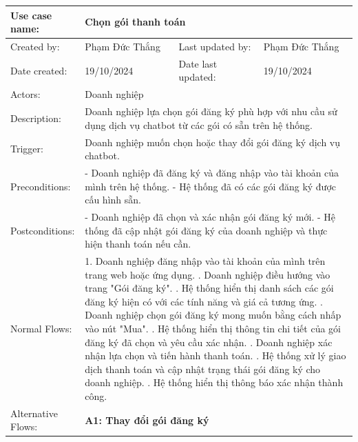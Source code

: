 \begin{table}[H]
\centering
\begin{tabular}{|l|l|l|l|}
\hline
Use case name: & \multicolumn{3}{|l|}{Chọn gói thanh toán} \\
\hline
Created by: & Phạm Đức Thắng & Last updated by: & Phạm Đức Thắng \\
\hline
Date created: & 19/10/2024 & Date last updated: & 19/10/2024 \\
\hline
Actors: & \multicolumn{3}{|l|}{Doanh nghiệp} \\
\hline
Description: & \multicolumn{3}{|p{12cm}|}{Doanh nghiệp lựa chọn gói đăng ký phù hợp với nhu cầu sử dụng dịch vụ chatbot từ các gói có sẵn trên hệ thống.} \\
\hline
Trigger: & \multicolumn{3}{|p{12cm}|}{Doanh nghiệp muốn chọn hoặc thay đổi gói đăng ký dịch vụ chatbot.} \\
\hline
Preconditions: & \multicolumn{3}{|p{12cm}|}{
- Doanh nghiệp đã đăng ký và đăng nhập vào tài khoản của mình trên hệ thống. \newline
- Hệ thống đã có các gói đăng ký được cấu hình sẵn.
} \\
\hline
Postconditions: & \multicolumn{3}{|p{12cm}|}{
- Doanh nghiệp đã chọn và xác nhận gói đăng ký mới. \newline
- Hệ thống đã cập nhật gói đăng ký của doanh nghiệp và thực hiện thanh toán nếu cần.
} \\
\hline
Normal Flows: & \multicolumn{3}{|p{12cm}|}{
1. Doanh nghiệp đăng nhập vào tài khoản của mình trên trang web hoặc ứng dụng. \newline
2. Doanh nghiệp điều hướng vào trang "Gói đăng ký". \newline
3. Hệ thống hiển thị danh sách các gói đăng ký hiện có với các tính năng và giá cả tương ứng. \newline
4. Doanh nghiệp chọn gói đăng ký mong muốn bằng cách nhấp vào nút "Mua". \newline
5. Hệ thống hiển thị thông tin chi tiết của gói đăng ký đã chọn và yêu cầu xác nhận. \newline
6. Doanh nghiệp xác nhận lựa chọn và tiến hành thanh toán. \newline
7. Hệ thống xử lý giao dịch thanh toán và cập nhật trạng thái gói đăng ký cho doanh nghiệp. \newline
8. Hệ thống hiển thị thông báo xác nhận thành công.
}\\
\hline
Alternative Flows: & \multicolumn{3}{|p{12cm}|}{
\textbf{A1: Thay đổi gói đăng ký} \newline
}
\end{tabular}
\end{table}
